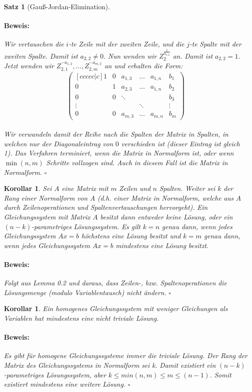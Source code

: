 \documentclass{report}
\theoremstyle{customrem}
\theoremstyle{customdef}
\newtheorem{kor}[definition]{Korollar}
\newtheorem{satz}[definition]{Satz}
\renewenvironment{proof}{\vspace{-.75cm}\paragraph{Beweis: }}{\hfill$\square$}
\begin{document}
\begin{satz}[Gauß-Jordan-Elimination]
\begin{proof}
			Wir vertauschen die $i$-te Zeile mit der zweiten Zeile, und die $j$-te Spalte mit der zweiten Spalte. Damit ist $a_{2,2} \neq 0$. Nun wenden wir $Z_{2}^{\frac{1}{a_{2,2}}}$ an. Damit ist $a_{2,2} = 1$. Jetzt wenden wir $Z_{2,1}^{-a_{1,2}}, \dots, Z_{2,m}^{-a_{m,2}}$ an und erhalten die Form:
			$$
			\begin{pmatrix}[ccccc|c]
			1 & 0 & a_{1, 3} & \dots & a_{1, n} & b_1\\
			0 & 1 & a_{2, 3} & \dots & a_{1, n} & b_2\\
			0 & 0 & \ddots	 &		 & 			& b_3\\
			\vdots&&		 & \ddots&			& \vdots\\
			0 & 0 & a_{m, 3} & \dots & a_{m, n} & b_m
			\end{pmatrix}
			$$\\
			Wir verwandeln damit der Reihe nach die Spalten der Matrix in Spalten, in welchen nur der Diagonaleintrag von $0$ verschieden ist (dieser Eintrag ist gleich 1).
			Das Verfahren terminiert, wenn die Matrix in Normalform ist, oder wenn $\min(n, m)$ Schritte vollzogen sind. Auch in diesem Fall ist die Matrix in Normalform.
		\end{proof}
	\end{satz}
	\begin{kor}
		Sei $A$ eine Matrix mit $m$ Zeilen und $n$ Spalten. Weiter sei $k$ der Rang einer Normalform von $A$ (d.h. einer Matrix in Normalform, welche aus $A$ durch Zeilenoperationen und Spaltenvertauschungen hervorgeht). Ein Gleichungssystem  mit Matrix $A$ besitzt dann entweder keine Lösung, oder ein $(n-k)$-parametriges Lösungssystem. Es gilt $k=n$ genau dann, wenn jedes Gleichungssystem $Ax=b$ höchstens eine Lösung besitzt und $k=m$ genau dann, wenn jedes Gleichungssystem $Ax=b$ mindestens eine Lösung besitzt.\\
		\begin{proof}
			Folgt aus Lemma 0.2 und daraus, dass Zeilen-, bzw. Spaltenoperationen die Lösungsmenge (modulo Variablentausch) nicht ändern.
		\end{proof}
	\end{kor}
	\begin{kor}
		\label{kor5}
		Ein homogenes Gleichungssystem mit weniger Gleichungen als Variablen hat mindestens eine nicht triviale Lösung.\\
		\begin{proof}
			Es gibt für homogene Gleichungssysteme immer die triviale Lösung. Der Rang der Matrix des Gleichungssystems in Normalform sei k. Damit existiert ein $(n-k)$-parametriges Lösungssystem, aber $k \le min(n, m) \le m \le (n-1)$. Somit existiert mindestens eine weitere Lösung.
		\end{proof}
	\end{kor}
\end{document}
